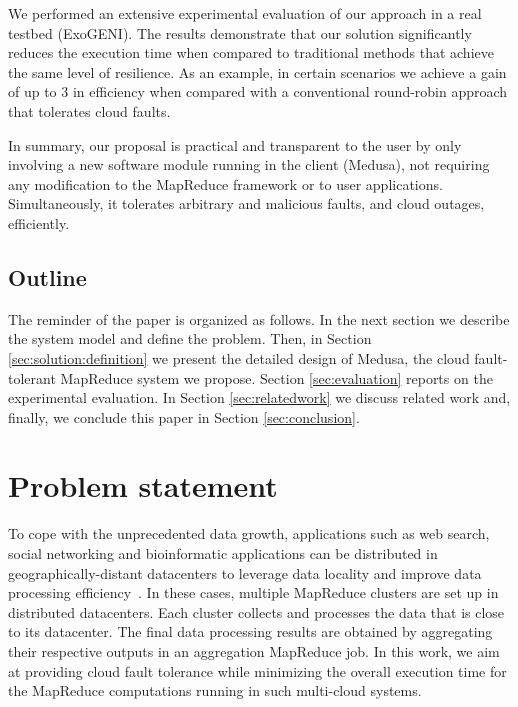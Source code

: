 \documentclass[10pt, conference, compsocconf]{IEEEtran}
\begin{document}
We performed an extensive experimental evaluation of our approach in a real testbed (ExoGENI).
The results demonstrate that our solution significantly reduces the execution time when compared to traditional methods that achieve the same level of resilience.
As an example, in certain scenarios we achieve a gain of up to 3 in efficiency when compared with a conventional round-robin approach that tolerates cloud faults.

In summary, our proposal is practical and transparent to the user by only involving a new software module running in the client (Medusa), not requiring any modification to the MapReduce framework or to user applications.
Simultaneously, it tolerates arbitrary and malicious faults, and cloud outages, efficiently.


\subsection{Outline}

The reminder of the paper is organized as follows. In the next section we describe the system model and define the problem. Then, in Section \ref{sec:solution:definition} we present the detailed design of Medusa, the cloud fault-tolerant MapReduce system we propose. Section \ref{sec:evaluation} reports on the experimental evaluation. In Section \ref{sec:relatedwork} we discuss related work and, finally, we conclude this paper in Section \ref{sec:conclusion}.

\section{Problem statement}
\label{sec:problem:statement}

To cope with the unprecedented data growth, applications such as web search, social networking and bioinformatic applications can be distributed in geographically-distant datacenters to leverage data locality and improve data processing efficiency~\cite{Baeza-Yates:2009:FMW:1645953.1646009, Matsunaga09cloudblast:combining}. In these cases, multiple MapReduce clusters are set up in distributed datacenters. Each cluster collects and processes the data that is close to its datacenter. The final data processing results are obtained by aggregating their respective outputs in an aggregation MapReduce job. In this work, we aim at providing cloud fault tolerance while minimizing the overall execution time for the MapReduce computations running in such multi-cloud systems.
\end{document}
